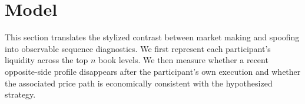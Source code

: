 \documentclass[11pt]{article}
\begin{document}
\section{Model}
\label{sec:model}
This section translates the stylized contrast between market making and spoofing into observable sequence diagnostics. We
first represent each participant's liquidity across the top $n$ book levels. We then measure whether a recent
opposite-side profile disappears after the participant's own execution and whether the associated price path is
economically consistent with the hypothesized strategy.


\end{document}
